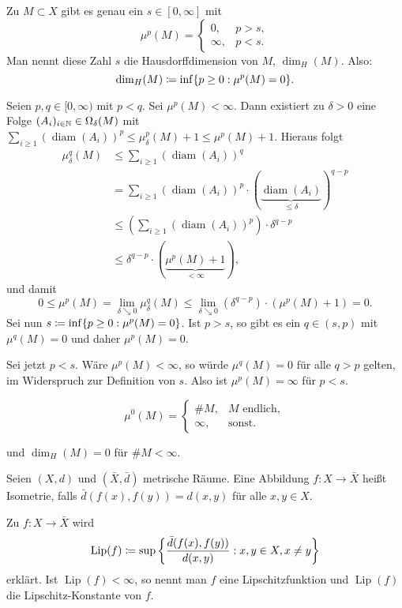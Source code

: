 \documentclass[a4paper,twoside,DIV15,BCOR12mm]{scrbook}
\DeclareMathOperator{\diam}{diam}
\DeclareMathOperator{\Lip}{Lip}
\newcommand{\downto}{\mathrel\searrow}
\begin{document}
\begin{proposition}
\label{prop:2.21}
Zu \(M \subset X\) gibt es genau ein \(s\in[0,\infty]\) mit
\[
\mu^p(M) = \begin{cases} 0, & p>s, \\ \infty, & p<s. \end{cases}
\]
Man nennt diese Zahl \(s\) die Hausdorffdimension von \(M\), \(\dim_H(M)\). Also:
\[
\dim_H(M) \da \inf\{p\geq0 : \mu^p(M)=0\}.
\]

\end{proposition}

\begin{beweis}
Seien \(p,q \in [0,\infty)\) mit \(p<q\). Sei \(\mu^p(M)<\infty\). Dann existiert zu \(\delta>0\) eine Folge \((A_i)_{i\in\mathbb{N}} \in \Omega_\delta(M)\) mit \(\sum_{i\geq1} {(\diam(A_i))}^p \leq \mu_\delta^p(M)+1 \leq \mu^p(M)+1\). Hieraus folgt
\begin{align*}
\mu_\delta^q(M) &
\leq \sum_{i\geq1} {(\diam(A_i))}^q \\ &
= \sum_{i\geq1} (\diam(A_i))^p \cdot (\underbrace{\diam(A_i)}_{\leq\delta})^{q-p} \\ &
\leq (\sum_{i\geq1} (\diam(A_i))^p)\cdot \delta^{q-p} \\ &
\leq \delta^{q-p}\cdot (\underbrace{\mu^p(M)+1}_{<\infty}),
\end{align*}
und damit
\[
0 \leq \mu^p(M) = \lim_{\delta\downto0} \mu_\delta^q(M) \leq \lim_{\delta\downto0}(\delta^{q-p})\cdot(\mu^p(M)+1) = 0.
\]
Sei nun \(s \da \inf\{p\geq0 : \mu^p(M) = 0\}\). Ist \(p>s\), so gibt es ein \(q\in(s,p)\) mit \(\mu^q(M) = 0\) und daher \(\mu^p(M)=0\).
\par
Sei jetzt \(p<s\). Wäre \(\mu^p(M)<\infty\), so würde \(\mu^q(M)=0\) für alle \(q>p\) gelten, im Widerspruch zur Definition von \(s\). Also ist \(\mu^p(M)=\infty\) für \(p<s\).
\end{beweis}

\begin{beispiel}
$$
\mu^0(M) = \begin{cases} \#M, & M \text{ endlich}, \\ \infty, & \text{sonst}. \end{cases}
$$
\par
und \(\dim_H(M) = 0\) für \(\#M < \infty\).
\end{beispiel}

\begin{definition}
Seien \((X,d)\) und \((\bar X,\bar d)\) metrische Räume. Eine Abbildung \(f: X \rightarrow \bar X\) heißt Isometrie, falls \(\bar d(f(x),f(y)) = d(x,y)\) für alle $ x,y\in X$. 
\par
Zu \(f:X \rightarrow \bar X\) wird
\[
\Lip(f) \da \sup\left\{\frac{\bar d(f(x),f(y))}{d(x,y)} : x,y \in X, x\neq y\right\}
\]
erklärt. Ist \(\Lip(f)<\infty\), so nennt man \(f\) eine Lipschitzfunktion und \(\Lip(f)\) die Lipschitz-Konstante von \(f\).
\end{definition}
\end{document}
